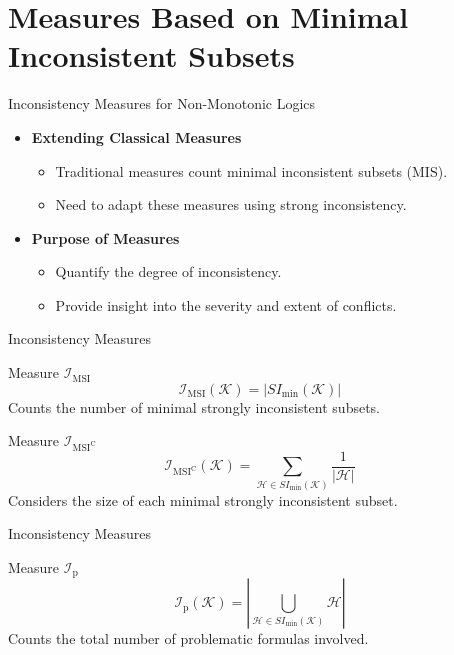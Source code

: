 \section{Measures Based on Minimal Inconsistent Subsets}

\begin{frame}{Inconsistency Measures for Non-Monotonic Logics}
    \begin{itemize}
        \item \textbf{Extending Classical Measures}
              \begin{itemize}
                  \item Traditional measures count minimal inconsistent subsets (MIS).
                  \item Need to adapt these measures using strong inconsistency.
              \end{itemize}
        \item \textbf{Purpose of Measures}
              \begin{itemize}
                  \item Quantify the degree of inconsistency.
                  \item Provide insight into the severity and extent of conflicts.
              \end{itemize}
    \end{itemize}
\end{frame}

\begin{frame}{Inconsistency Measures}
    \begin{block}{Measure \( \mathcal{I}_{\text{MSI}} \)}
        \[
            \mathcal{I}_{\text{MSI}}(\mathcal{K}) = \left| SI_{\min}(\mathcal{K}) \right|
        \]
        Counts the number of minimal strongly inconsistent subsets.
    \end{block}
    \begin{block}{Measure \( \mathcal{I}_{\text{MSI}^\text{C}} \)}
        \[
            \mathcal{I}_{\text{MSI}^\text{C}}(\mathcal{K}) = \sum\limits_{\mathcal{H} \in SI_{\min}(\mathcal{K})} \frac{1}{|\mathcal{H}|}
        \]
        Considers the size of each minimal strongly inconsistent subset.
    \end{block}
\end{frame}

\begin{frame}{Inconsistency Measures}
    \begin{block}{Measure \( \mathcal{I}_{\text{p}} \)}
        \[
            \mathcal{I}_{\text{p}}(\mathcal{K}) = \left| \bigcup\limits_{\mathcal{H} \in SI_{\min}(\mathcal{K})} \mathcal{H} \right|
        \]
        Counts the total number of problematic formulas involved.
    \end{block}
\end{frame}

